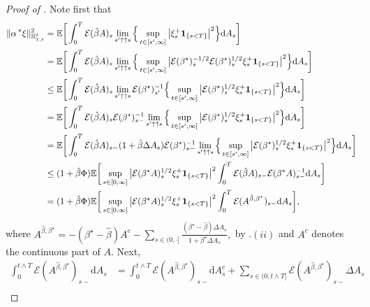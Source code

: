 \documentclass[10pt]{article} %
\newcommand\cE{\mathcal E}
\newcommand{\smalltext}[1]{\text{\fontsize{4}{4}\selectfont$#1$}}
\def \E{\mathbb{E}}
\def \H{\mathbb{H}}
\newcommand{\brs}[1]{\prescript{\ast}{}{#1}}
\newcommand{\1}{\mathbf{1}}
\def\d{\mathrm{d}}
\begin{document}
\begin{proof}[Proof of ]
	Note first that
	\begin{align*}
		\|\alpha \brs{\xi}\|_{\H^\smalltext{2}_{\smalltext{T}\smalltext{,}\smalltext{\hat\beta}}}^2 
		&= \E\bigg[\int_0^T\cE(\hat\beta A)_s \lim_{s^\prime \uparrow\uparrow s} \Big\{\sup_{t \in [s^\prime,\infty]}\big|\xi^+_s\mathbf{1}_{\{s < T\}}\big|^2\Big\} \d A_s \bigg] \\
		&= \E\bigg[\int_0^T\cE(\hat\beta A)_s \lim_{s^\prime \uparrow\uparrow s} \Big\{\sup_{t \in [s^\prime,\infty]}\big|\cE(\beta^\star)^{-1/2}_s\cE(\beta^\star)^{1/2}_s\xi^+_s\mathbf{1}_{\{s < T\}}\big|^2\Big\} \d A_s \bigg] \\
		&\leq \E\bigg[\int_0^T\cE(\hat\beta A)_s \lim_{s^\prime \uparrow\uparrow s} \cE(\beta^\star)^{-1}_{s^\prime}\Big\{\sup_{t \in [s^\prime,\infty]}\big|\cE(\beta^\star)^{1/2}_s\xi^+_s\mathbf{1}_{\{s < T\}}\big|^2\Big\} \d A_s \bigg] \\
		&= \E\bigg[\int_0^T\cE(\hat\beta A)_s \cE(\beta^\star)^{-1}_{s-} \lim_{s^\prime \uparrow\uparrow s} \Big\{\sup_{t \in [s^\prime,\infty]}\big|\cE(\beta^\star)^{1/2}_s\xi^+_s\mathbf{1}_{\{s < T\}}\big|^2\Big\} \d A_s \bigg] \\
		&= \E\bigg[\int_0^T\cE(\hat\beta A)_{s-}(1+\hat\beta\Delta A_s) \cE(\beta^\star)^{-1}_{s-} \lim_{s^\prime \uparrow\uparrow s} \Big\{\sup_{t \in [s^\prime,\infty]}\big|\cE(\beta^\star)^{1/2}_s\xi^+_s\mathbf{1}_{\{s < T\}}\big|^2\Big\} \d A_s \bigg] \\
		&\leq (1+\hat\beta \Phi)\E\bigg[\sup_{s \in [0,\infty]}\big|\cE(\beta^\star A)^{1/2}_s\xi^+_s\mathbf{1}_{\{s < T\}}\big|^2 \int_0^T\cE(\hat\beta A)_{s-}\cE(\beta^\star A)^{-1}_{s-}\d A_s\bigg] \\
		&= (1+\hat\beta \Phi)\E\bigg[\sup_{s \in [0,\infty]}\big|\cE(\beta^\star A)^{1/2}_s\xi^+_s\mathbf{1}_{\{s < T\}}\big|^2 \int_0^T\cE(A^{\hat\beta,\beta^\star})_{s-}\d A_s\bigg],
	\end{align*}
	where $A^{\hat\beta,\beta^\star} = -(\beta^\star - \hat\beta)A^c - \sum_{s \in (0,\cdot]} \frac{(\beta^\star- \hat\beta)\Delta A_s}{1+\beta^\star \Delta A_s},$ by .$(ii)$ and $A^c$ denotes the continuous part of $A$. Next,
	\begin{align*}
		\int_0^{t \land T}\cE(A^{\hat\beta,\beta^\star})_{s-}\d A_s 
		&= \int_0^{t \land T}\cE(A^{\hat\beta,\beta^\star})_{s-}\d A^c_s + \sum_{s \in (0,t \land T]}\cE(A^{\hat\beta,\beta^\star})_{s-}\Delta A_s \\

\end{align*}
\end{proof}
\end{document}
